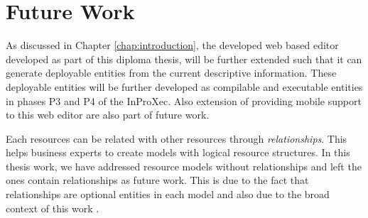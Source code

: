 \section*{Future Work}
\label{sec:futurework}
As discussed in Chapter \ref{chap:introduction}, the developed web based editor developed as part of this diploma thesis, will be further extended such that it can generate deployable entities from the current descriptive information. These deployable entities will be further developed as compilable and executable entities in phases P3 and P4 of the InProXec\cite{Sungur2015}. Also extension of providing mobile support to this web editor are also part of future work. 

Each resources can be related with other resources through \textit{relationships}. This helps business experts to create models with logical resource structures. In this thesis work, we have addressed resource models without relationships and left the ones contain relationships as future work. This is due to the fact that relationships are optional entities in each model and also due to the broad context of this work \cite{Sungur2014a}. 



